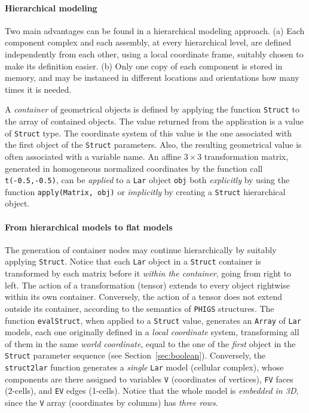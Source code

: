 \documentclass{juliacon}
\begin{document}
\paragraph*{Hierarchical modeling}
Two main advantages can be found in a hierarchical modeling approach.
(a) Each component complex and each assembly, at every hierarchical level,
are defined independently from each other, using a local coordinate
frame, suitably chosen to make its definition easier. (b) Only
one copy of each component is stored in memory, and may be instanced in
different locations and orientations how many times it is needed.

A \emph{container} of geometrical objects is defined by applying the
function \texttt{Struct} to the array of contained objects. The value
returned from the application is a value of \texttt{Struct} type. The
coordinate system of this value is the one associated with the first
object of the \texttt{Struct} parameters. Also, the resulting
geometrical value is often associated with a variable name.
An affine \(3\times 3\) transformation matrix, generated in homogeneous
normalized coordinates by the function call \texttt{t(-0.5,-0.5)}, can
be \emph{applied} to a \texttt{Lar} object \texttt{obj} both \emph{explicitly} by
using the function \texttt{apply(Matrix, obj)} or \emph{implicitly} by
creating a \texttt{Struct} hierarchical object.

\paragraph*{From hierarchical models to flat models}
The generation of container nodes may continue hierarchically by
suitably applying \texttt{Struct}. Notice that each \texttt{Lar} object in a
\texttt{Struct} container is transformed by each matrix before it
\emph{within the container}, going from right to left. The action of a
transformation (tensor) extends to every object rightwise within its
own container. Conversely, the action of a tensor does not extend outside
its container, according to the semantics of \texttt{PHIGS} structures.
The function \texttt{evalStruct}, when applied to a \texttt{Struct}
value, generates an \texttt{Array} of \texttt{Lar} models, each one originally
defined in a \emph{local coordinate} system, transforming all of them in
the same \emph{world coordinate}, equal to the one of the \emph{first}
object in the \texttt{Struct} parameter sequence (see Section~\ref{sec:boolean}).
Conversely, the \texttt{struct2lar} function generates a \emph{single}
\texttt{Lar} model (cellular complex), whose components are there assigned
 to variables \texttt{V} (coordinates of vertices),
\texttt{FV} faces (2-cells), and \texttt{EV} edges (1-cells). Notice
that the whole model is \emph{embedded in 3D}, since the \texttt{V}
array (coordinates by columns) has \emph{three rows}.
\end{document}
